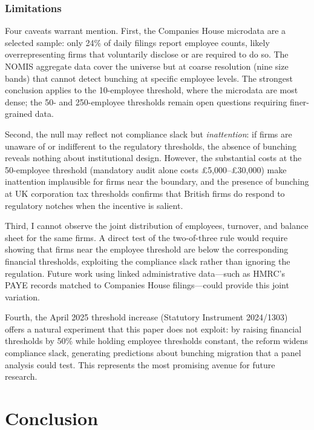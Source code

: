 \documentclass[12pt]{article}
\begin{document}
\subsubsection*{Limitations} Four caveats warrant mention. First, the Companies House microdata are a selected sample: only 24\% of daily filings report employee counts, likely overrepresenting firms that voluntarily disclose or are required to do so. The NOMIS aggregate data cover the universe but at coarse resolution (nine size bands) that cannot detect bunching at specific employee levels. The strongest conclusion applies to the 10-employee threshold, where the microdata are most dense; the 50- and 250-employee thresholds remain open questions requiring finer-grained data.

Second, the null may reflect not compliance slack but \textit{inattention}: if firms are unaware of or indifferent to the regulatory thresholds, the absence of bunching reveals nothing about institutional design. However, the substantial costs at the 50-employee threshold (mandatory audit alone costs \pounds5,000--\pounds30,000) make inattention implausible for firms near the boundary, and the presence of bunching at UK corporation tax thresholds \citep{devereux2014} confirms that British firms do respond to regulatory notches when the incentive is salient.

Third, I cannot observe the joint distribution of employees, turnover, and balance sheet for the same firms. A direct test of the two-of-three rule would require showing that firms near the employee threshold are below the corresponding financial thresholds, exploiting the compliance slack rather than ignoring the regulation. Future work using linked administrative data---such as HMRC's PAYE records matched to Companies House filings---could provide this joint variation.

Fourth, the April 2025 threshold increase (Statutory Instrument 2024/1303) offers a natural experiment that this paper does not exploit: by raising financial thresholds by 50\% while holding employee thresholds constant, the reform widens compliance slack, generating predictions about bunching migration that a panel analysis could test. This represents the most promising avenue for future research.


\section{Conclusion}
\end{document}
